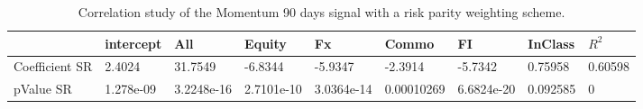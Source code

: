 \begin{table}[H]
\centering
\begin{tabular}{lllllllll}
\hline& intercept & All & Equity & Fx & Commo & FI & InClass & $R^{2}$ \\ 
\hline 
Coefficient SR & 2.4024 & 31.7549 & -6.8344 & -5.9347 & -2.3914 & -5.7342 & 0.75958 & 0.60598 \\ 
pValue SR & 1.278e-09 & 3.2248e-16 & 2.7101e-10 & 3.0364e-14 & 0.00010269 & 6.6824e-20 & 0.092585 & 0 \\ 
\hline
\end{tabular}
\caption{Correlation study of the Momentum 90 days signal with a risk parity weighting scheme.}
\label{MOM90RP_CORR}
\end{table}